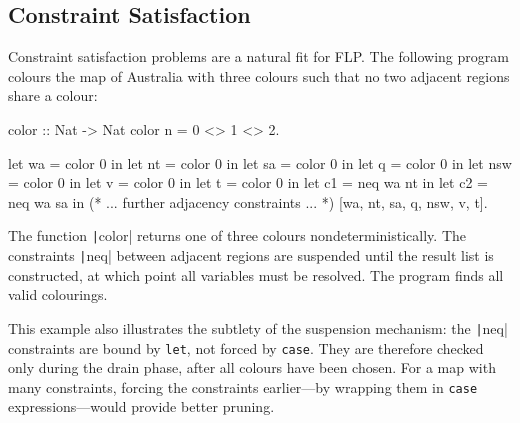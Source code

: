 \subsection{Constraint Satisfaction}

Constraint satisfaction problems are a natural fit for FLP. The following
program colours the map of Australia with three colours such that no two
adjacent regions share a colour:
%
\begin{haskellcode}
color :: Nat -> Nat
color n = 0 <> 1 <> 2.

let wa = color 0 in let nt = color 0 in
let sa = color 0 in let q  = color 0 in
let nsw = color 0 in let v = color 0 in
let t = color 0 in
let c1 = neq wa nt in let c2 = neq wa sa in
(* ... further adjacency constraints ... *)
[wa, nt, sa, q, nsw, v, t].
\end{haskellcode}
%
\noindent The function \texttt|color| returns one of three colours
nondeterministically. The constraints \texttt|neq| between adjacent
regions are suspended until the result list is constructed, at which point all
variables must be resolved. The program finds all valid colourings.

This example also illustrates the subtlety of the suspension mechanism: the
\texttt|neq| constraints are bound by \texttt{let}, not forced by
\texttt{case}. They are therefore checked only during the drain phase, after
all colours have been chosen. For a map with many constraints, forcing the
constraints earlier---by wrapping them in \texttt{case} expressions---would
provide better pruning.
